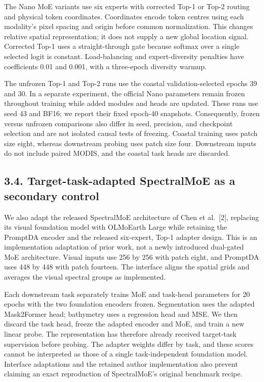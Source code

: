 \documentclass[
  10pt,
  english,
]{article}
\begin{document}
The Nano MoE variants use six experts with corrected Top-1 or Top-2
routing and physical token coordinates. Coordinates encode token centres
using each modality's pixel spacing and origin before common
normalization. This changes relative spatial representation; it does not
supply a new global location signal. Corrected Top-1 uses a
straight-through gate because softmax over a single selected logit is
constant. Load-balancing and expert-diversity penalties have
coefficients 0.01 and 0.001, with a three-epoch diversity warmup.

The unfrozen Top-1 and Top-2 runs use the coastal validation-selected
epochs 39 and 30. In a separate experiment, the official Nano parameters
remain frozen throughout training while added modules and heads are
updated. These runs use seed 43 and BF16; we report their fixed epoch-40
snapshots. Consequently, frozen versus unfrozen comparisons also differ
in seed, precision, and checkpoint selection and are not isolated causal
tests of freezing. Coastal training uses patch size eight, whereas
downstream probing uses patch size four. Downstream inputs do not
include paired MODIS, and the coastal task heads are discarded.

\hypertarget{target-task-adapted-spectralmoe-as-a-secondary-control}{%
\subsection{3.4. Target-task-adapted SpectralMoE as a secondary
control}\label{target-task-adapted-spectralmoe-as-a-secondary-control}}

We also adapt the released SpectralMoE architecture of Chen et
al.~{[}2{]}, replacing its visual foundation model with OLMoEarth Large
while retaining the PromptDA encoder and the released six-expert, Top-1
adapter design. This is an implementation adaptation of prior work, not
a newly introduced dual-gated MoE architecture. Visual inputs use 256 by
256 with patch eight, and PromptDA uses 448 by 448 with patch fourteen.
The interface aligns the spatial grids and averages the visual spectral
groups as implemented.

Each downstream task separately trains MoE and task-head parameters for
20 epochs with the two foundation encoders frozen. Segmentation uses the
adapted Mask2Former head; bathymetry uses a regression head and MSE. We
then discard the task head, freeze the adapted encoder and MoE, and
train a new linear probe. The representation has therefore already
received target-task supervision before probing. The adapter weights
differ by task, and these scores cannot be interpreted as those of a
single task-independent foundation model. Interface adaptations and the
retained author implementation also prevent claiming an exact
reproduction of SpectralMoE's original benchmark recipe.
\end{document}
